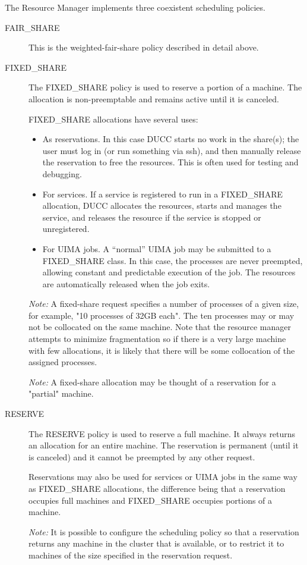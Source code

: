     The Resource Manager implements three coexistent scheduling policies. 
    \begin{description}
        \item[FAIR\_SHARE] This is the weighted-fair-share policy described in detail above.

        \item[FIXED\_SHARE] The FIXED\_SHARE policy is used to reserve a portion of a machine. The
          allocation is non-preemptable and remains active until it is canceled.

          FIXED\_SHARE allocations have several uses:
          \begin{itemize}
            \item As reservations.  In this case DUCC starts no work in the share(s); the user must
              log in (or run something via ssh), and then manually release the reservation to free
              the resources.  This is often used for testing and debugging.
            \item For services.  If a service is registered to run in a FIXED\_SHARE allocation,
              DUCC allocates the resources, starts and manages the service, and releases the
              resource if the service is stopped or unregistered.
            \item For UIMA jobs.  A ``normal'' UIMA job may be submitted to a FIXED\_SHARE
              class.  In this case, the processes are never preempted, allowing constant and
              predictable execution of the job.  The resources are automatically released when
              the job exits.
          \end{itemize}
          
          {\em Note:} A fixed-share request specifies a number of processes of a given size, for example, "10 
          processes of 32GB each". The ten processes may or may not be collocated on the same 
          machine. Note that the resource manager attempts to minimize fragmentation so if there is a 
          very large machine with few allocations, it is likely that there will be some collocation of the 
          assigned processes. 
          
          {\em Note:} A fixed-share allocation may be thought of a reservation for a "partial" machine. 
          
        \item[RESERVE] The RESERVE policy is used to reserve a full machine. It always returns an
          allocation for an entire machine. The reservation is permanent (until it is canceled) and
          it cannot be preempted by any other request.

          Reservations may also be used for services or UIMA jobs in the same way as FIXED\_SHARE 
          allocations, the difference being that a reservation occupies full machines and FIXED\_SHARE
          occupies portions of a machine.

          {\em Note:} It is possible to configure the scheduling policy so that a reservation returns any machine in 
          the cluster that is available, or to restrict it to machines of the size specified in the reservation 
          request. 
    \end{description}
    
